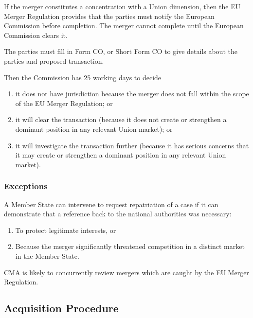 \documentclass[
]{article}
\newenvironment{Shaded}{}{}
\newcommand{\NormalTok}[1]{#1}
\providecommand{\tightlist}{%
  \setlength{\itemsep}{0pt}\setlength{\parskip}{0pt}}
\begin{document}
If the merger constitutes a concentration with a Union dimension, then
the EU Merger Regulation provides that the parties must notify the
European Commission before completion. The merger cannot complete until
the European Commission clears it.

The parties must fill in Form CO, or Short Form CO to give details about
the parties and proposed transaction.

Then the Commission has 25 working days to decide

\begin{enumerate}
\def\labelenumi{\arabic{enumi}.}
\tightlist
\item
  it does not have jurisdiction because the merger does not fall within
  the scope of the EU Merger Regulation; or
\item
  it will clear the transaction (because it does not create or
  strengthen a dominant position in any relevant Union market); or
\item
  it will investigate the transaction further (because it has serious
  concerns that it may create or strengthen a dominant position in any
  relevant Union market).
\end{enumerate}

\hypertarget{exceptions}{%
\subsubsection{Exceptions}\label{exceptions}}

A Member State can intervene to request repatriation of a case if it can
demonstrate that a reference back to the national authorities was
necessary:

\begin{enumerate}
\def\labelenumi{\arabic{enumi}.}
\tightlist
\item
  To protect legitimate interests, or
\item
  Because the merger significantly threatened competition in a distinct
  market in the Member State.
\end{enumerate}

\begin{Shaded}
\begin{Highlighting}[]
\NormalTok{CMA is likely to concurrently review mergers which are caught by the EU Merger Regulation. }
\end{Highlighting}
\end{Shaded}

\hypertarget{acquisition-procedure}{%
\subsection{Acquisition Procedure}\label{acquisition-procedure}}
\end{document}
